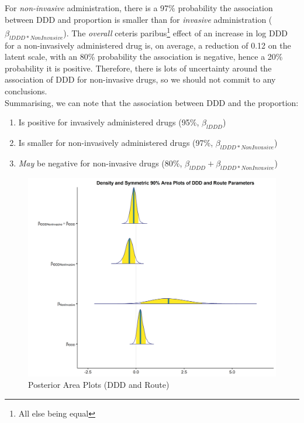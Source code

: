\documentclass[11pt,twoside]{article}
\numberwithin{Theorem}{section}
\numberwithin{Definition}{section}
\numberwithin{Lemma}{section}
\numberwithin{Algorithm}{section}
\numberwithin{equation}{section}
\begin{document}
\newpage

For \textit{non-invasive} administration, there is a 97\% probability the association between DDD and proportion is smaller than for \textit{invasive} administration ($\beta_{lDDD*NonInvasive}$). The \textit{overall} ceteris paribus\footnote{All else being equal} effect of an increase in log DDD for a non-invasively administered drug is, on average, a reduction of 0.12 on the latent scale, with an 80\% probability the association is negative, hence a 20\% probability it is positive. Therefore, there is lots of uncertainty around the association of DDD for non-invasive drugs, so we should not commit to any conclusions.\\

Summarising, we can note that the association between DDD and the proportion:


\begin{enumerate}
	\item Is positive for invasively administered drugs (95\%, $\beta_{lDDD}$)
	\item Is smaller for non-invasively administered drugs (97\%, $\beta_{lDDD*NonInvasive}$)
	\item \textit{May} be negative for non-invasive drugs (80\%, $\beta_{lDDD} + \beta_{lDDD*NonInvasive}$)
\end{enumerate}


\begin{figure}[h!]
	\centering
	\includegraphics[width = 1\textwidth]{Figures/5_1_Areas_DDD.png}
	\caption{Posterior Area Plots (DDD and Route)} \label{fig::5_Areas_DDD}	
\end{figure}
\end{document}
